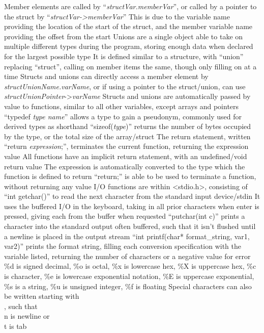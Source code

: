 \documentclass[11 pt, twoside]{article}
\newenvironment{outline*}
{
	\begin{outline}[enumerate]
	}
	{\end{outline}
}
\begin{document}
\begin{outline*}
\3 Member elements are called by ``\textit{structVar.memberVar}'', or called by a pointer to the struct by ``\textit{structVar->memberVar}''
\4 This is due to the variable name providing the location of the start of the struct, and the member variable name providing the offset from the start
\2 Unions are a single object able to take on multiple different types during the program, storing enough data when declared for the largest possible type
\3 It is defined similar to a structure, with ``union'' replacing ``struct'', calling on member items the same, though only filling on at a time
\2 Structs and unions can directly access a member element by \textit{structUnionName.varName}, or if using a pointer to the struct/union, can use \textit{structUnionPointer}->\textit{varName}
\3 Structs and unions are automatically passed by value to functions, similar to all other variables, except arrays and pointers
\2 ``typedef \textit{type name}'' allows a type to gain a pseudonym, commonly used for derived types as shorthand
\2 ``sizeof(\textit{type})'' returns the number of bytes occupied by the type, or the total size of the array/struct
\1 The return statement, written ``return \textit{expression};'', terminates the current function, returning the expression value
\2 All functions have an implicit return statement, with an undefined/void return value
\2 The expression is automatically converted to the type which the function is defined to return
\2 ``return;'' is able to be used to terminate a function, without returning any value
\1 I/O functions are within <stdio.h>, consisting of ``int getchar()'' to read the next character from the standard input device/stdin
\2 It uses the buffered I/O in the keyboard, taking in all prior characters when enter is pressed, giving each from the buffer when requested
\2 ``putchar(int c)'' prints a character into the standard output often buffered, such that it isn't flushed until a newline is placed in the output stream
\2 ``int printf(char* format\_string, var1, var2)'' prints the format string, filling each conversion specification with the variable listed, returning the number of characters or a negative value for error
\3 \%d is signed decimal, \%o is octal, \%x is lowercase hex, \%X is uppercase hex, \%c is character, \%e is lowercase exponential notation, \%E is uppercase exponential, \%s is a string, \%u is unsigned integer, \%f is floating
\3 Special characters can also be written starting with \\, such that \\n is newline or \\t is tab

\end{outline*}
\end{document}
